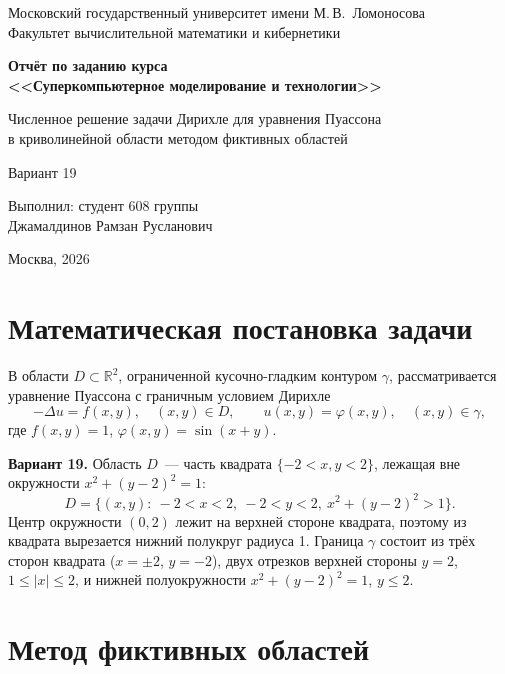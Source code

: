 \documentclass[12pt,a4paper]{article}
\begin{document}
\begin{titlepage}
\centering
{\large Московский государственный университет имени М.\,В.~Ломоносова\\
Факультет вычислительной математики и кибернетики\par}
\vspace{5cm}
{\Large\bfseries Отчёт по заданию курса\\
<<Суперкомпьютерное моделирование и технологии>>\par}
\vspace{1cm}
{\large Численное решение задачи Дирихле для уравнения Пуассона\\
в криволинейной области методом фиктивных областей\par}
\vspace{1cm}
{\large Вариант 19\par}
\vfill
\begin{flushright}
Выполнил: студент 608 группы\\[1mm]
Джамалдинов Рамзан Русланович
\end{flushright}
\vspace{1cm}
Москва, 2026
\end{titlepage}

\tableofcontents
\newpage

\section{Математическая постановка задачи}

В области $D\subset\mathbb{R}^2$, ограниченной кусочно-гладким контуром $\gamma$,
рассматривается уравнение Пуассона с граничным условием Дирихле
\begin{equation}\label{eq:pois}
-\Delta u = f(x,y),\quad (x,y)\in D,\qquad u(x,y)=\varphi(x,y),\quad (x,y)\in\gamma,
\end{equation}
где $f(x,y)=1$, $\varphi(x,y)=\sin(x+y)$.

\textbf{Вариант 19.} Область $D$~--- часть квадрата $\{-2<x,y<2\}$, лежащая вне окружности
$x^2+(y-2)^2=1$:
\[
D=\{(x,y):\ -2<x<2,\ -2<y<2,\ x^2+(y-2)^2>1\}.
\]
Центр окружности $(0,2)$ лежит на верхней стороне квадрата, поэтому из квадрата
вырезается нижний полукруг радиуса 1. Граница $\gamma$ состоит из трёх сторон квадрата
($x=\pm2$, $y=-2$), двух отрезков верхней стороны $y=2$, $1\le|x|\le2$, и нижней
полуокружности $x^2+(y-2)^2=1$, $y\le2$.

\section{Метод фиктивных областей}
\end{document}
